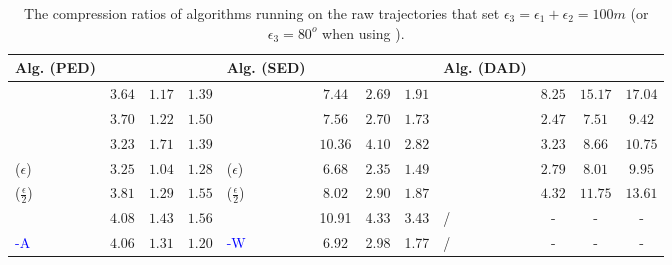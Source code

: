 {\begin{table}
	\caption{\small The compression ratios of algorithms running on the raw trajectories that set $\epsilon_3=\epsilon_1+\epsilon_2=100m$ (or $\epsilon_3=80^o$ when using \dad).}
	\centering
	\scriptsize
	\vspace{-1ex}
	\begin{tabular}{|l|c|c|c|l|c|c|c|l|c|c|c|}
		\hline
		\bf{Alg. (PED)}  &\ucar &\geolife &\mopsi & \bf{Alg. (SED)}  &\ucar &\geolife &\mopsi &\bf{Alg. (DAD)}  &\ucar &\geolife &\mopsi \\
		\hline
		{\dpa} &	$3.64$ & $ 1.17$ &	$1.39$	&\dpa &$7.44$ & $2.69$ &$1.91$  & \dpa	& $8.25$	& $15.17$	& $17.04$ \\
		\hline
		{\tpa} &	$3.70 $ & $1.22$ &	$1.50 $	&\tpa 	& $7.56 $& $2.70$ & $1.73 $ & \tpa	& $2.47 $	& $ 	7.51 $	& $ 	9.42  $ \\
		\hline
		{\bqsa} &	$3.23$ & $1.71$ &	$1.39 $	&\squishe &$10.36 $ & $4.10  $ & $2.82$ & \opwa	& $3.23$	& $8.66$	& $10.75$ \\
		\hline
		{\siped($\epsilon$)} &	$3.25$ & $ 1.04$ &	$1.28 $	&\cised($\epsilon$) & $6.68 $ &$ 2.35$ &$ 1.49	$ & \interval	& $2.79 $	& $8.01$	& $9.95 $ \\
		\hline
		{\siped($\frac{\epsilon}{2}$)} &	$3.81 $ & $1.29 $ &	$1.55 $ &\cised($\frac{\epsilon}{2}$) &$8.02  $ & $2.90$ & $1.87$& \intersec	& $4.32 $	& $11.75$	& $13.61 $ \\
		\hline
		{\operb} &	$4.08 $ & $1.43 $ & $1.56 $	& \textcolor{blue}{\dagots} &10.91 &4.33 &3.43 & /&- &- &- \\
		\hline
		\textcolor{blue}{\operb-A} &	${4.06} $ & ${1.31} $ & ${1.20} $	& \textcolor{blue}{\cised-W} &6.92 &2.98 &1.77 & / &- &- &- \\
		\hline
	\end{tabular}
	\label{tab:cr}	
	\vspace{-2ex}
\end{table}
 	 	
 	 	
 	 	


}
